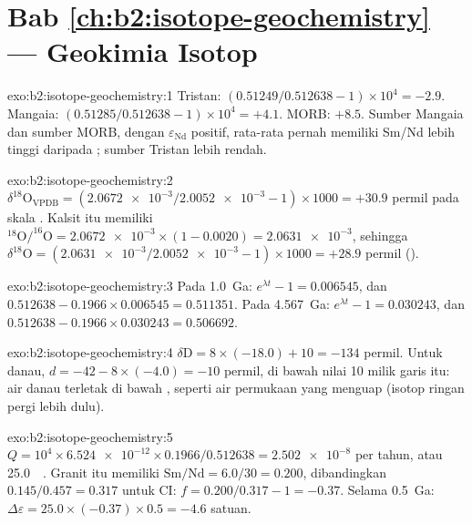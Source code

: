 \section*{Bab \ref{ch:b2:isotope-geochemistry} --- Geokimia Isotop}

\begin{solution}{exo:b2:isotope-geochemistry:1}
Tristan: $(0.51249/0.512638 - 1)\times10^4 = -2.9$. Mangaia: $(0.51285/0.512638 -
1)\times10^4 = +4.1$. MORB: $+8.5$. Sumber Mangaia dan sumber MORB, dengan
$\varepsilon_{\mathrm{Nd}}$ positif, rata-rata pernah memiliki Sm/Nd lebih tinggi daripada ;
sumber Tristan lebih rendah.
\end{solution}

\begin{solution}{exo:b2:isotope-geochemistry:2}
$\delta^{18}\mathrm{O}_{\mathrm{VPDB}} = (\num{2.0672e-3}/\num{2.0052e-3} - 1)\times1000 =
+30.9$ permil pada skala . Kalsit itu memiliki $^{18}\mathrm{O}/^{16}\mathrm{O} =
\num{2.0672e-3}\times(1 - 0.0020) = \num{2.0631e-3}$, sehingga $\delta^{18}\mathrm{O} =
(\num{2.0631e-3}/\num{2.0052e-3} - 1)\times1000 = +28.9$ permil ().
\end{solution}

\begin{solution}{exo:b2:isotope-geochemistry:3}
Pada \qty{1.0}{Ga}: $e^{\lambda t} - 1 = 0.006545$, dan $0.512638 - 0.1966\times0.006545 =
0.511351$. Pada \qty{4.567}{Ga}: $e^{\lambda t}-1 = 0.030243$, dan $0.512638 -
0.1966\times0.030243 = 0.506692$.
\end{solution}

\begin{solution}{exo:b2:isotope-geochemistry:4}
$\delta\mathrm{D} = 8\times(-18.0) + 10 = -134$ permil. Untuk danau, $d = -42 -
8\times(-4.0) = -10$ permil, di bawah nilai 10 milik garis itu: air danau terletak di bawah , seperti air permukaan yang menguap (isotop ringan pergi lebih dulu).
\end{solution}

\begin{solution}{exo:b2:isotope-geochemistry:5}
$Q = 10^4\times\num{6.524e-12}\times0.1966/0.512638 = \num{2.502e-8}$ per tahun, atau
\qty{25.0}{\per\Ga}. Granit itu memiliki $\mathrm{Sm}/\mathrm{Nd} = 6.0/30 = 0.200$,
dibandingkan $0.145/0.457 = 0.317$ untuk CI: $f = 0.200/0.317 - 1 = -0.37$. Selama
\qty{0.5}{Ga}: $\Delta\varepsilon = 25.0\times(-0.37)\times0.5 = -4.6$ satuan.
\end{solution}

